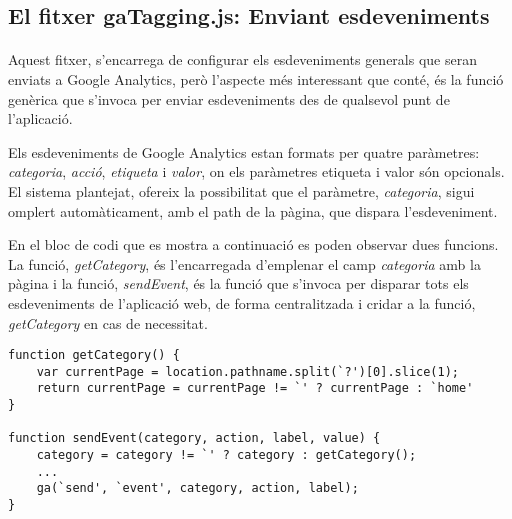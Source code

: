 \subsection{El fitxer gaTagging.js: Enviant esdeveniments}

    \paragraph{}
    Aquest fitxer, s'encarrega de configurar els esdeveniments generals que seran enviats a Google Analytics, però l'aspecte més interessant que conté, és la funció genèrica que s'invoca per enviar esdeveniments des de qualsevol punt de l'aplicació.

    Els esdeveniments de Google Analytics estan formats per quatre paràmetres: \emph{categoria}, \emph{acció}, \emph{etiqueta} i \emph{valor}, on els paràmetres etiqueta i valor són opcionals. El sistema plantejat, ofereix la possibilitat que el paràmetre, \emph{categoria}, sigui omplert automàticament, amb el path de la pàgina, que dispara l'esdeveniment.

    En el bloc de codi que es mostra a continuació es poden observar dues funcions. La funció, \emph{getCategory}, és l'encarregada d'emplenar el camp \emph{categoria} amb la pàgina i la funció, \emph{sendEvent}, és la funció que s'invoca per disparar tots els esdeveniments de l'aplicació web, de forma centralitzada i cridar a la funció, \emph{getCategory} en cas de necessitat.

    \begin{lstlisting}[style=rawOwn,caption={Funcions que controlen l'enviament d'esdeveniments a GA}]
function getCategory() {
    var currentPage = location.pathname.split(`?')[0].slice(1);
    return currentPage = currentPage != `' ? currentPage : `home'
}

function sendEvent(category, action, label, value) {
    category = category != `' ? category : getCategory();
    ...
    ga(`send', `event', category, action, label);
}
    \end{lstlisting}
